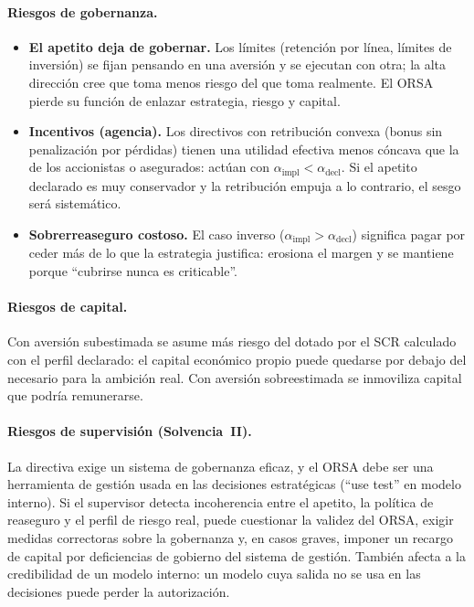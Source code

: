 \documentclass[a4paper,12pt]{article}
\begin{document}
\paragraph{Riesgos de gobernanza.}
\begin{itemize}[leftmargin=*,itemsep=1pt]
\item \textbf{El apetito deja de gobernar.} Los l\'imites (retenci\'on por l\'inea, l\'imites de inversi\'on) se fijan pensando en una aversi\'on y se ejecutan con otra; la alta direcci\'on cree que toma menos riesgo del que toma realmente. El ORSA pierde su funci\'on de enlazar estrategia, riesgo y capital.
\item \textbf{Incentivos (agencia).} Los directivos con retribuci\'on convexa (bonus sin penalizaci\'on por p\'erdidas) tienen una utilidad efectiva menos c\'oncava que la de los accionistas o asegurados: act\'uan con $\alpha_{\text{impl}}<\alpha_{\text{decl}}$. Si el apetito declarado es muy conservador y la retribuci\'on empuja a lo contrario, el sesgo ser\'a sistem\'atico.
\item \textbf{Sobrerreaseguro costoso.} El caso inverso ($\alpha_{\text{impl}}>\alpha_{\text{decl}}$) significa pagar por ceder m\'as de lo que la estrategia justifica: erosiona el margen y se mantiene porque ``cubrirse nunca es criticable''.
\end{itemize}

\paragraph{Riesgos de capital.} Con aversi\'on subestimada se asume m\'as riesgo del dotado por el SCR calculado con el perfil declarado: el capital econ\'omico propio puede quedarse por debajo del necesario para la ambici\'on real. Con aversi\'on sobreestimada se inmoviliza capital que podr\'ia remunerarse.

\paragraph{Riesgos de supervisi\'on (Solvencia~II).} La directiva exige un sistema de gobernanza eficaz, y el ORSA debe ser una herramienta de gesti\'on usada en las decisiones estrat\'egicas (``use test'' en modelo interno). Si el supervisor detecta incoherencia entre el apetito, la pol\'itica de reaseguro y el perfil de riesgo real, puede cuestionar la validez del ORSA, exigir medidas correctoras sobre la gobernanza y, en casos graves, imponer un recargo de capital por deficiencias de gobierno del sistema de gesti\'on. Tambi\'en afecta a la credibilidad de un modelo interno: un modelo cuya salida no se usa en las decisiones puede perder la autorizaci\'on.
\end{document}
